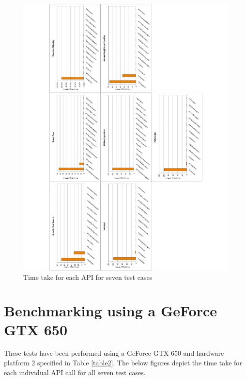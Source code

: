 \documentclass[paper=a4, fontsize=11pt]{scrartcl}
\numberwithin{equation}{section}		%
\numberwithin{figure}{section}			%
\numberwithin{table}{section}				%
\begin{document}
\begin{figure}[!h]
\centering
\includegraphics[scale=0.6]{../imgs/x630.pdf}
\caption{Time take for each API for seven test cases}
\label{Time take for each API for seven test cases}
\end{figure}




\newpage
\section{Benchmarking using a GeForce GTX 650}
These tests have been performed using a GeForce GTX 650 and hardware platform 2 specified in Table \ref{table2}. The below figures depict the time take for each individual API call for all seven test cases.
\end{document}
